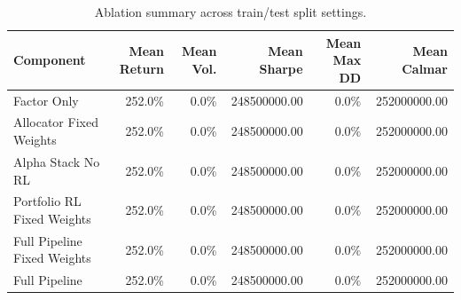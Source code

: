 \begin{table}[H]
\centering
\caption{Ablation summary across train/test split settings.}
\label{tab:ablation_summary}
\begin{tabular}{@{} l r r r r r @{}}
\toprule
Component & Mean Return & Mean Vol. & Mean Sharpe & Mean Max DD & Mean Calmar \\
\midrule
Factor Only & 252.0\% & 0.0\% & 248500000.00 & $0.0\%$ & 252000000.00 \\
Allocator Fixed Weights & 252.0\% & 0.0\% & 248500000.00 & $0.0\%$ & 252000000.00 \\
Alpha Stack No RL & 252.0\% & 0.0\% & 248500000.00 & $0.0\%$ & 252000000.00 \\
Portfolio RL Fixed Weights & 252.0\% & 0.0\% & 248500000.00 & $0.0\%$ & 252000000.00 \\
Full Pipeline Fixed Weights & 252.0\% & 0.0\% & 248500000.00 & $0.0\%$ & 252000000.00 \\
Full Pipeline & 252.0\% & 0.0\% & 248500000.00 & $0.0\%$ & 252000000.00 \\
\bottomrule
\end{tabular}
\end{table}

